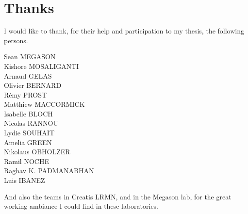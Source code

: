 \chapter*{Thanks}
{}

I would like to thank, for their help and participation to my thesis, the following persons.

\begin{center}
Sean MEGASON\\
Kishore MOSALIGANTI\\
Arnaud GELAS\\
Olivier BERNARD\\
Rémy PROST\\
Matthiew MACCORMICK\\
Isabelle BLOCH\\
Nicolas RANNOU\\
Lydie SOUHAIT\\
Amelia GREEN\\
Nikolaus OBHOLZER\\
Ramil NOCHE\\
Raghav K. PADMANABHAN\\
Luis IBANEZ\\
\end{center}

And also the teams in Creatis LRMN, and in the Megason lab, for the great working ambiance I could find in these laboratories.

\appendix

%





